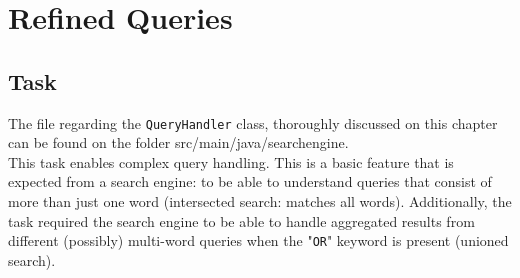\chapter{Refined Queries}



\section{Task} %
The file regarding the {\tt QueryHandler} class, thoroughly discussed on this chapter can be found on the folder src/main/java/searchengine.\\
This task enables complex query handling. This is a basic feature that is expected from a search engine: to be able to understand queries that consist of more than just one word (intersected search: matches all words). Additionally, the task required the search engine to be able to handle aggregated results from different (possibly) multi-word queries when the "{\tt OR}" keyword is present (unioned search).

